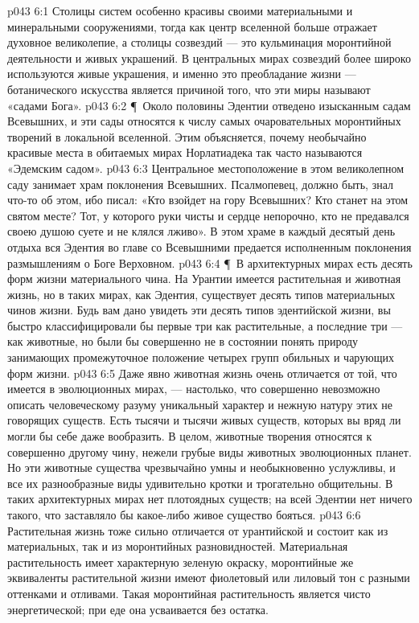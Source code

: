 \vs p043 6:1 Столицы систем особенно красивы своими материальными и минеральными сооружениями, тогда как центр вселенной больше отражает духовное великолепие, а столицы созвездий --- это кульминация моронтийной деятельности и живых украшений. В центральных мирах созвездий более широко используются живые украшения, и именно это преобладание жизни --- ботанического искусства является причиной того, что эти миры называют «садами Бога».
\vs p043 6:2 \P\ Около половины Эдентии отведено изысканным садам Всевышних, и эти сады относятся к числу самых очаровательных моронтийных творений в локальной вселенной. Этим объясняется, почему необычайно красивые места в обитаемых мирах Норлатиадека так часто называются «Эдемским садом».
\vs p043 6:3 Центральное местоположение в этом великолепном саду занимает храм поклонения Всевышних. Псалмопевец, должно быть, знал что\hyp{}то об этом, ибо писал: «Кто взойдет на гору Всевышних? Кто станет на этом святом месте? Тот, у которого руки чисты и сердце непорочно, кто не предавался своею душою суете и не клялся лживо». В этом храме в каждый десятый день отдыха вся Эдентия во главе со Всевышними предается исполненным поклонения размышлениям о Боге Верховном.
\vs p043 6:4 \P\ В архитектурных мирах есть десять форм жизни материального чина. На Урантии имеется растительная и животная жизнь, но в таких мирах, как Эдентия, существует десять типов материальных чинов жизни. Будь вам дано увидеть эти десять типов эдентийской жизни, вы быстро классифицировали бы первые три как растительные, а последние три --- как животные, но были бы совершенно не в состоянии понять природу занимающих промежуточное положение четырех групп обильных и чарующих форм жизни.
\vs p043 6:5 Даже явно животная жизнь очень отличается от той, что имеется в эволюционных мирах, --- настолько, что совершенно невозможно описать человеческому разуму уникальный характер и нежную натуру этих не говорящих существ. Есть тысячи и тысячи живых существ, которых вы вряд ли могли бы себе даже вообразить. В целом, животные творения относятся к совершенно другому чину, нежели грубые виды животных эволюционных планет. Но эти животные существа чрезвычайно умны и необыкновенно услужливы, и все их разнообразные виды удивительно кротки и трогательно общительны. В таких архитектурных мирах нет плотоядных существ; на всей Эдентии нет ничего такого, что заставляло бы какое\hyp{}либо живое существо бояться.
\vs p043 6:6 Растительная жизнь тоже сильно отличается от урантийской и состоит как из материальных, так и из моронтийных разновидностей. Материальная растительность имеет характерную зеленую окраску, моронтийные же эквиваленты растительной жизни имеют фиолетовый или лиловый тон с разными оттенками и отливами. Такая моронтийная растительность является чисто энергетической; при еде она усваивается без остатка.
